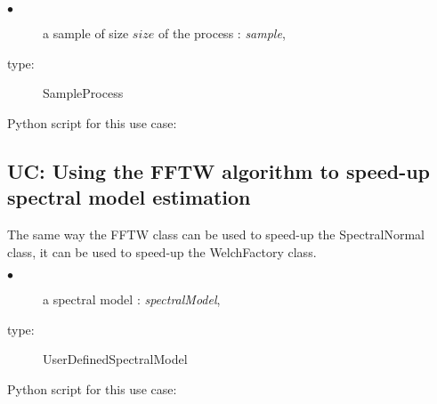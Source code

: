 {
  \begin{description}
  \item[$\bullet$] a sample of size $size$ of the process : {\itshape sample},
  \item[type:] SampleProcess
  \end{description}
}
\espace

Python script for this use case:



\subsection{UC: Using the FFTW algorithm to speed-up spectral model estimation} \label{FFTWWelchFactory}

The same way the FFTW class can be used to speed-up the SpectralNormal class, it can be used to speed-up the WelchFactory class.

{
  \begin{description}
  \item[$\bullet$] a spectral model : {\itshape spectralModel},
  \item[type:] UserDefinedSpectralModel
  \end{description}
}
\espace

Python script for this use case:



